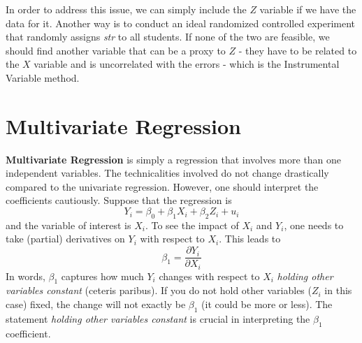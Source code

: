 \par\medskip
In order to address this issue, we can simply include the $Z$ variable if we have the data for it. Another way is to conduct an ideal randomized controlled experiment that randomly assigns \textit{str} to all students. If none of the two are feasible, we should find another variable that can be a proxy to $Z$ - they have to be related to the $X$ variable and is uncorrelated with the errors - which is the Instrumental Variable method. \par\medskip

\section{Multivariate Regression}
\textbf{Multivariate Regression} is simply a regression that involves more than one independent variables. The technicalities involved do not change drastically compared to the univariate regression. However, one should interpret the coefficients cautiously. Suppose that the regression is
\[
Y_i = \beta_0 + \beta_1 X_i + \beta_2 Z_i+u_i
\]
and the variable of interest is $X_i$. To see the impact of $X_i$ and $Y_i$, one needs to take (partial) derivatives on $Y_i$ with respect to $X_i$. This leads to
\[
\beta_1 = \frac{\partial Y_i}{\partial X_i}
\]
In words, $\beta_1$ captures how much $Y_i$ changes with respect to $X_i$ \emph{holding other variables constant} (ceteris paribus). If you do not hold other variables ($Z_i$ in this case) fixed, the change will not exactly be $\beta_1$ (it could be more or less). The statement \emph{holding other variables constant} is crucial in interpreting the $\beta_1$ coefficient.
\par\medskip




